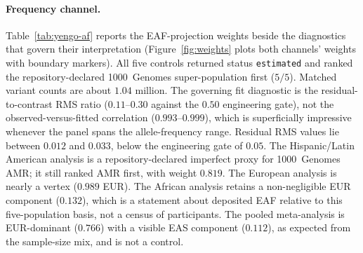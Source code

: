 \documentclass[11pt,a4paper]{article}
\begin{document}
\paragraph{Frequency channel.}
Table~\ref{tab:yengo-af} reports the EAF-projection weights beside the
diagnostics that govern their interpretation
(Figure~\ref{fig:weights} plots both channels' weights with boundary
markers). All five controls returned
status \texttt{estimated} and ranked the repository-declared
1000~Genomes super-population first ($5/5$). Matched variant counts are
about $1.04$ million. The governing fit diagnostic is the
residual-to-contrast RMS ratio ($0.11$--$0.30$ against the $0.50$
engineering gate), not the observed-versus-fitted correlation
($0.993$--$0.999$), which is superficially impressive whenever the panel
spans the allele-frequency range. Residual RMS values lie between $0.012$
and $0.033$, below the engineering gate of $0.05$. The Hispanic/Latin
American analysis is a repository-declared imperfect proxy for
1000~Genomes AMR; it still ranked AMR first, with weight $0.819$. The
European analysis is nearly a vertex ($0.989$ EUR). The African analysis
retains a non-negligible EUR component ($0.132$), which is a statement
about deposited EAF relative to this five-population basis, not a census
of participants. The pooled meta-analysis is EUR-dominant ($0.766$)
with a visible EAS component ($0.112$), as expected from the
sample-size mix, and is not a control.
\end{document}
